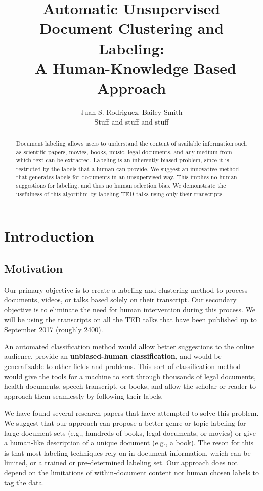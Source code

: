 \documentclass[letterpaper, 11pt]{article}
\title{Automatic Unsupervised Document Clustering and Labeling:\\ A Human-Knowledge Based Approach}
\author{Juan S. Rodriguez, Bailey Smith\\
    Stuff and stuff and stuff}
\begin{document}
    
    
    \maketitle
    
    


\begin{abstract} 
Document labeling allows users to understand the content of available information such as scientific papers, movies, books, music, legal documents, and any medium from which text can be extracted. Labeling is an inherently biased problem, since it is restricted by the labels that a human can provide. We suggest an innovative method that generates labels for documents in an unsupervised way. This implies no human suggestions for labeling, and thus no human selection bias. We demonstrate the usefulness of this algorithm by labeling TED talks using only their transcripts.
\end{abstract}


    \section{Introduction}\label{introduction}

\subsection{Motivation}\label{motivation}

Our primary objective is to create a labeling and clustering method to process documents, videos, or talks based solely on their transcript. Our secondary objective is to eliminate the need for human intervention during this process. We will be using the transcripts on all the TED talks that have been published up to September 2017 (roughly 2400).

An automated classification method would allow better
suggestions to the online audience, provide an
\textbf{unbiased-human classification}, and would be generalizable to
other fields and problems. This sort of classification method would give
the tools for a machine to sort through thousands of legal documents,
health documents, speech transcript, or books, and allow the
scholar or reader to approach them seamlessly by following their labels.

We have found several research papers that have attempted to solve this
problem. We suggest that our approach can propose a better genre or
topic labeling for large document sets (e.g., hundreds of books, legal
documents, or movies) or give a human-like description of a unique
document (e.g., a book). The reson for this is that most labeling
techniques rely on in-document information, which can be limited,
or a trained or pre-determined labeling set. Our approach does not
depend on the limitations of within-document content nor human chosen
labels to tag the data.
\end{document}
